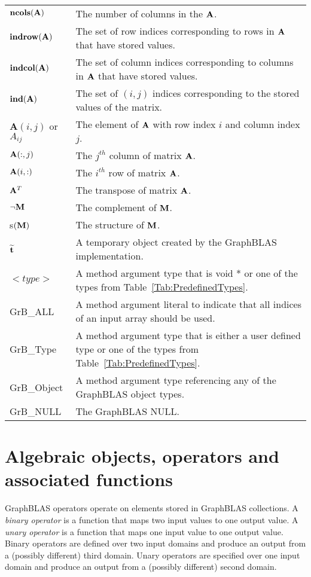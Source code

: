 \begin{tabular}[H]{l|p{5in}}
$\mathbf{ncols}({\bf A})$ & The number of columns in the ${\bf A}$.\\
$\mathbf{indrow}({\bf A})$ & The set of row indices corresponding to rows in ${\bf A}$ that have stored values.  \\
$\mathbf{indcol}({\bf A})$ & The set of column indices corresponding to columns in ${\bf A}$ that have stored values. \\
$\mathbf{ind}({\bf A})$ & The set of $(i,j)$ indices corresponding to the stored values of the matrix. \\
$\mathbf{A}(i,j)$ or $A_{ij}$ & The element of ${\bf A}$ with row index $i$ and column index $j$.\\
${\bf A}(:,j)$ & The $j^{th}$ column of matrix ${\bf A}$.\\
${\bf A}(i,:)$ & The $i^{th}$ row of matrix ${\bf A}$.\\
${\bf A}^T$ &The transpose of matrix ${\bf A}$. \\
$\neg{\bf M}$ & The complement of ${\bf M}$.\\
s$({\bf M})$ & The structure of ${\bf M}$.\\
${\bf \widetilde{t}}$ & A temporary object created  by the GraphBLAS implementation. \\
$<type>$ & A method argument type that is {\sf void *} or one of the types from Table~\ref{Tab:PredefinedTypes}. \\
{\sf GrB\_ALL} & A method argument literal to indicate that all indices of an input array should be used.\\
{\sf GrB\_Type} & A method argument type that is either a user defined type or one of the  types from Table~\ref{Tab:PredefinedTypes}.\\
{\sf GrB\_Object} &  A method argument type referencing any of the GraphBLAS object types.\\
{\sf GrB\_NULL} & The GraphBLAS NULL.
\end{tabular}

\restoregeometry

\section{Algebraic objects, operators and associated functions}

GraphBLAS operators operate on elements stored in GraphBLAS collections. A 
\emph{binary operator} is a function that maps two input values to one 
output value. A \emph{unary operator} is a function that maps one input value 
to one output value.  Binary operators are defined over two input domains
and produce an output from a (possibly different) third domain. Unary
operators are specified over one input domain and produce an output from a
(possibly different) second domain.

